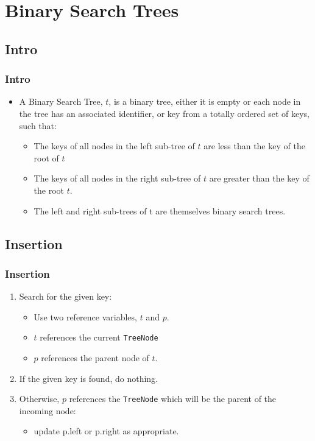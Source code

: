 \documentclass{beamer}
\begin{document}
\section{Binary Search Trees}
\subsection{Intro}
\begin{frame}
\frametitle{Intro}
\begin{itemize}
\item A Binary Search Tree, $t$, is a binary tree, either it is empty or each node in the tree has an associated identifier, or {\color{red} key} from a totally ordered set of keys, such that:
\begin{itemize}
\item The keys of all nodes in the left sub-tree of $t$ are less than the key of the root of $t$
\item The keys of all nodes in the right sub-tree of $t$ are greater than the key of the root $t$.
\item The left and right sub-trees of t are themselves binary search trees.
\end{itemize}
\end{itemize}
\end{frame}
\subsection{Insertion}
\begin{frame}
\frametitle{Insertion}
\begin{enumerate}
\item Search for the given key:
\begin{itemize}
\item Use two reference variables, $t$ and $p$.
\item $t$ references the current \texttt{TreeNode}
\item $p$ references the parent node of $t$.
\end{itemize}
\item If the given key is found, do nothing.
\item Otherwise, $p$ references the \texttt{TreeNode} which will be the parent of the incoming node:
\begin{itemize}
\item update p.left or p.right as appropriate.
\end{itemize}
\end{enumerate}
\end{frame}
\end{document}
